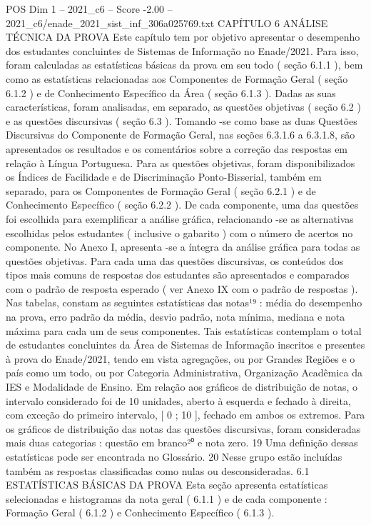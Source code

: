 \begin{textsample}{POS Dim 1 – 2021\_c6 – Score -2.00 – 2021\_c6/enade\_2021\_sist\_inf\_306a025769.txt}  \label{ex:f1_pos_206}
CAPÍTULO 6 ANÁLISE TÉCNICA DA PROVA Este capítulo tem por objetivo apresentar o desempenho dos estudantes concluintes de Sistemas de Informação no Enade/2021.
Para isso, foram calculadas as estatísticas básicas da prova em seu todo ( seção 6.1.1 ), bem como as estatísticas relacionadas aos Componentes de Formação Geral ( seção 6.1.2 ) e de Conhecimento Específico da Área ( seção 6.1.3 ).
Dadas as suas características, foram analisadas, em separado, as questões objetivas ( seção 6.2 ) e as questões discursivas ( seção 6.3 ).
Tomando -se como base as duas Questões Discursivas do Componente de Formação Geral, nas seções 6.3.1.6 a 6.3.1.8, são apresentados os resultados e os comentários sobre a correção das respostas em relação à Língua Portuguesa.
Para as questões objetivas, foram disponibilizados os Índices de Facilidade e de Discriminação Ponto-Bisserial, também em separado, para os Componentes de Formação Geral ( seção 6.2.1 ) e de Conhecimento Específico ( seção 6.2.2 ).
De cada componente, uma das questões foi escolhida para exemplificar a análise gráfica, relacionando -se as alternativas escolhidas pelos estudantes ( inclusive o gabarito ) com o número de acertos no componente.
No Anexo I, apresenta -se a íntegra da análise gráfica para todas as questões objetivas.
Para cada uma das questões discursivas, os conteúdos dos tipos mais comuns de respostas dos estudantes são apresentados e comparados com o padrão de resposta esperado ( ver Anexo IX com o padrão de respostas ).
Nas tabelas, constam as seguintes estatísticas das notas¹⁹ : média do desempenho na prova, erro padrão da média, desvio padrão, nota mínima, mediana e nota máxima para cada um de seus componentes.
Tais estatísticas contemplam o total de estudantes concluintes da Área de Sistemas de Informação inscritos e presentes à prova do Enade/2021, tendo em vista agregações, ou por Grandes Regiões e o país como um todo, ou por Categoria Administrativa, Organização Acadêmica da IES e Modalidade de Ensino.
Em relação aos gráficos de distribuição de notas, o intervalo considerado foi de 10 unidades, aberto à esquerda e fechado à direita, com exceção do primeiro intervalo, [ 0 ; 10 ], fechado em ambos os extremos.
Para os gráficos de distribuição das notas das questões discursivas, foram consideradas mais duas categorias : questão em branco²⁰ e nota zero. 19 Uma definição dessas estatísticas pode ser encontrada no Glossário. 20 Nesse grupo estão incluídas também as respostas classificadas como nulas ou desconsideradas. 6.1 ESTATÍSTICAS BÁSICAS DA PROVA Esta seção apresenta estatísticas selecionadas e histogramas da nota geral ( 6.1.1 ) e de cada componente : Formação Geral ( 6.1.2 ) e Conhecimento Específico ( 6.1.3 ).

\end{textsample}
